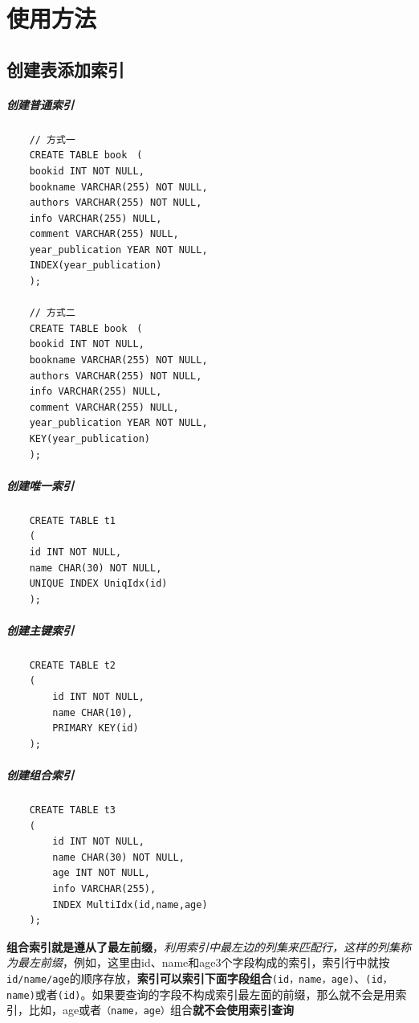\documentclass[UTF8,a4paper,12pt]{ctexbook}
\begin{document}
	
	\section{使用方法}	
		\subsection{创建表添加索引}
			\subparagraph{创建普通索引}
				\begin{lstlisting}
	// 方式一
	CREATE TABLE book　(
	bookid INT NOT NULL,　　　　　　　　　　　　　　　
	bookname VARCHAR(255) NOT NULL,　　　　　　　　　　 
	authors VARCHAR(255) NOT NULL,　　　　　　　　　　　 
	info VARCHAR(255) NULL,　　　　　　　　　　　　　　　　
	comment VARCHAR(255) NULL,　　　　　　　　　　　　　
	year_publication YEAR NOT NULL,　　　　　　　　　　　
	INDEX(year_publication)　　　　　　　　　　　　　　　
	);
	
	// 方式二
	CREATE TABLE book　(
	bookid INT NOT NULL,　　　　　　　　　　　　　　　
	bookname VARCHAR(255) NOT NULL,　　　　　　　　　　 
	authors VARCHAR(255) NOT NULL,　　　　　　　　　　　 
	info VARCHAR(255) NULL,　　　　　　　　　　　　　　　　
	comment VARCHAR(255) NULL,　　　　　　　　　　　　　
	year_publication YEAR NOT NULL,　　　　　　　　　　　
	KEY(year_publication)　　　　　　　　　　　　　　　
	);　　　　　　　　　　　　　　　　　　　　　　　　　　　　　　　　　　　　　　　　　　　　　　　　
				\end{lstlisting}
			\subparagraph{创建唯一索引}
				\begin{lstlisting}
	CREATE TABLE t1
	(
	id INT NOT NULL,
	name CHAR(30) NOT NULL,
	UNIQUE INDEX UniqIdx(id)
	);　
				\end{lstlisting}
			\subparagraph{创建主键索引}
				\begin{lstlisting}
	CREATE TABLE t2
	(
		id INT NOT NULL,
		name CHAR(10),
		PRIMARY KEY(id)
	);
				\end{lstlisting}
			
			\subparagraph{创建组合索引}
				\begin{lstlisting}
	CREATE TABLE t3
	(
		id INT NOT NULL,
		name CHAR(30) NOT NULL,
		age INT NOT NULL,
		info VARCHAR(255),
		INDEX MultiIdx(id,name,age)
	);
				\end{lstlisting}
				
				\textbf{组合索引就是遵从了最左前缀}，\textit{利用索引中最左边的列集来匹配行，这样的列集称为最左前缀}，例如，这里由id、name和age3个字段构成的索引，索引行中就按\verb|id/name/age|的顺序存放，\textbf{索引可以索引下面字段组合}\verb|(id，name，age)|、\verb|(id，name)|或者\verb|(id)|。如果要查询的字段不构成索引最左面的前缀，那么就不会是用索引，比如，age或者\verb|（name，age）|组合\textbf{就不会使用索引查询}
				
\end{document}
